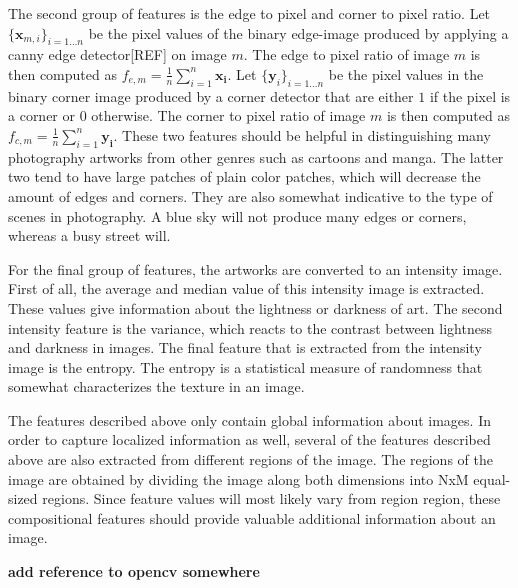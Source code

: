 The second group of features is the edge to pixel and corner to pixel ratio. Let $\{\mathbf{x}_{m,i} \}_{i=1\dots n}$ be the pixel values of the binary edge-image produced by applying a canny edge detector[REF] on image $m$. The edge to pixel ratio of image $m$ is then computed as $f_{e,m} = \frac{1}{n}\sum_{i=1}^{n} \mathbf{x_i} $. Let $\{\mathbf{y}_i \}_{i=1\dots n}$ be the pixel values in the binary corner image produced by a corner detector that are either $1$ if the pixel is a corner or $0$ otherwise. The corner to pixel ratio of image $m$ is then computed as  $f_{c,m} = \frac{1}{n}\sum_{i=1}^{n} \mathbf{y_i} $. These two features should be helpful in distinguishing many photography artworks from other genres such as cartoons and manga. The latter two tend to have large patches of plain color patches, which will decrease the amount of edges and corners. They are also somewhat indicative to the type of scenes in photography. A blue sky will not produce many edges or corners, whereas a busy street will.  


For the final group of features, the artworks are converted to an intensity image. First of all, the average and median value of this intensity image is extracted. These values give information about the lightness or darkness of art. The second intensity feature is the variance, which reacts to the contrast between lightness and darkness in images. The final feature that is extracted from the intensity image is the entropy. The entropy is a statistical measure of randomness that somewhat characterizes the texture in an image.  

The features described above only contain global information about images. In order to capture localized information as well, several of the features described above are also extracted from different regions of the image. The regions of the image are obtained by dividing the image along both dimensions into NxM equal-sized regions. Since feature values will most likely vary from region region, these compositional features should provide valuable additional information about an image. 

\textbf{add reference to opencv somewhere}


